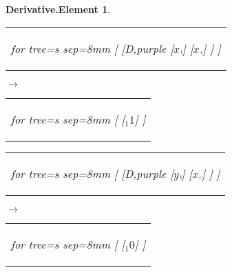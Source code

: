 \documentclass[UTF8,10pt]{ctexart}
\newcommand{\Bigskip}{\bigskip\medskip}
\newcommand{\I}{$_{\scriptscriptstyle 1}$}
\newcommand{\lc}{$_{\:\!\scriptscriptstyle\rm l\!}$}
\newcommand{\rc}{$_{\:\!\scriptscriptstyle\rm r\!}$}
\newcommand{\Derivative}{\rm D}
\newcommand{\x}{$x$}
\newcommand{\y}{$y$}
\newcommand{\Zero}{$0$}
\newcommand{\One}{$1$}
\newtheorem*{Derivative.Element}{\bf Derivative.Element }
\begin{document}
	\begin{center}\vspace*{\fill}
		\begin{Derivative.Element}
			\qquad\par\Bigskip
			\begin{tabular}{c}
				\begin{forest}
					for tree={s sep=8mm}
					[
						[\Derivative,purple
							[\x\lc]
							[\x\rc]
						]
					]
				\end{forest}
			\end{tabular}
			\qquad
			$\longrightarrow$
			\qquad
			\begin{tabular}{c}
				\begin{forest}
					for tree={s sep=8mm}
					[
						[\I\One]
					]
				\end{forest}
			\end{tabular}
			\par\bigskip
			\begin{tabular}{c}
				\begin{forest}
					for tree={s sep=8mm}
					[
						[\Derivative,purple
							[\y\lc]
							[\x\rc]
						]
					]
				\end{forest}
			\end{tabular}
			\qquad
			$\longrightarrow$
			\qquad
			\begin{tabular}{c}
				\begin{forest}
					for tree={s sep=8mm}
					[
						[\I\Zero]
					]
				\end{forest}
			\end{tabular}
		\end{Derivative.Element}
	\vspace*{\fill}\end{center}

	\newpage
\end{document}
